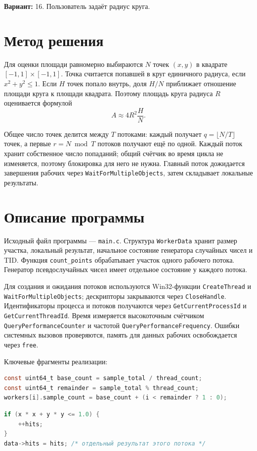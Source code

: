 \documentclass[unicode, 12pt, a4paper, oneside, fleqn]{article}
\begin{document}
{\bfseries Вариант:} 16. Пользователь задаёт радиус круга.

\section{Метод решения}
Для оценки площади равномерно выбираются $N$ точек $(x,y)$ в квадрате $[-1,1]\times[-1,1]$. Точка считается попавшей в круг единичного радиуса, если $x^2+y^2\leq 1$. Если $H$ точек попало внутрь, доля $H/N$ приближает отношение площади круга к площади квадрата. Поэтому площадь круга радиуса $R$ оценивается формулой
\[
    A \approx 4R^2\frac{H}{N}.
\]

Общее число точек делится между $T$ потоками: каждый получает $q=\lfloor N/T\rfloor$ точек, а первые $r=N\bmod T$ потоков получают ещё по одной. Каждый поток хранит собственное число попаданий; общий счётчик во время цикла не изменяется, поэтому блокировка для него не нужна. Главный поток дожидается завершения рабочих через \texttt{WaitForMultipleObjects}, затем складывает локальные результаты.

\section{Описание программы}
Исходный файл программы — \texttt{main.c}. Структура \texttt{WorkerData} хранит размер участка, локальный результат, начальное состояние генератора случайных чисел и TID. Функция \texttt{count\_points} обрабатывает участок одного рабочего потока. Генератор псевдослучайных чисел имеет отдельное состояние у каждого потока.

Для создания и ожидания потоков используются Win32-функции \texttt{CreateThread} и \texttt{WaitForMultipleObjects}; дескрипторы закрываются через \texttt{CloseHandle}. Идентификаторы процесса и потоков получаются через \texttt{GetCurrentProcessId} и \texttt{GetCurrentThreadId}. Время измеряется высокоточным счётчиком \texttt{QueryPerformanceCounter} и частотой \texttt{QueryPerformanceFrequency}. Ошибки системных вызовов проверяются, память для данных рабочих освобождается через \texttt{free}.

Ключевые фрагменты реализации:
\begin{lstlisting}[language=C]
const uint64_t base_count = sample_total / thread_count;
const uint64_t remainder = sample_total % thread_count;
workers[i].sample_count = base_count + (i < remainder ? 1 : 0);
\end{lstlisting}

\begin{lstlisting}[language=C]
if (x * x + y * y <= 1.0) {
    ++hits;
}
data->hits = hits; /* отдельный результат этого потока */
\end{lstlisting}
\end{document}
